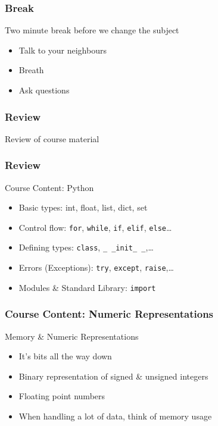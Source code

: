\begin{frame}[fragile]
\frametitle{Break}

Two minute break before we change the subject
\begin{itemize}
\item Talk to your neighbours
\item Breath
\item Ask questions
\end{itemize}
\end{frame}

\begin{frame}[fragile]
\frametitle{Review}

Review of course material
\end{frame}

\begin{frame}[fragile]
\frametitle{Review}

\begin{block}{Course Content: Python}
\begin{itemize}
\item Basic types: int, float, list, dict, set
\item Control flow: \lstinline{for}, \lstinline{while}, \lstinline{if}, \lstinline{elif}, \lstinline{else}\ldots
\item Defining types: \lstinline{class}, \lstinline{_ _init_ _},\ldots
\item Errors (Exceptions): \lstinline{try}, \lstinline{except}, \lstinline{raise},\ldots
\item Modules \& Standard Library: \lstinline{import}
\end{itemize}
\end{block}

\end{frame}

\begin{frame}[fragile]
\frametitle{Course Content: Numeric Representations}
\begin{block}{Memory \& Numeric Representations}
\begin{itemize}
\item It's bits all the way down
\item Binary representation of signed \& unsigned integers
\item Floating point numbers
\item When handling a lot of data, think of memory usage
\end{itemize}
\end{block}
\end{frame}

